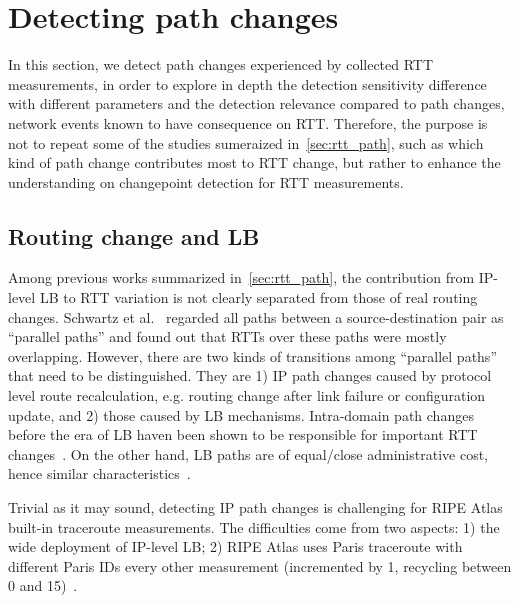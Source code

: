 
\section{Detecting path changes}
\label{sec:path}

In this section, we detect path changes experienced by collected RTT measurements, in order to explore in depth the detection sensitivity difference with different parameters and the detection relevance compared to path changes, network events known to have consequence on RTT.
Therefore, the purpose is not to repeat some of the studies sumeraized in~\ref{sec:rtt_path}, such as which kind of path change contributes most to RTT change, but rather to enhance the understanding on changepoint detection for RTT measurements.


\subsection{Routing change and \acf{LB}}

Among previous works summarized in~\ref{sec:rtt_path}, the contribution from IP-level LB to RTT variation is not clearly separated from those of real routing changes.
Schwartz et al.~\cite{Schwartz2010} regarded all paths between a source-destination pair as ``parallel paths'' and found out that RTTs over these paths were mostly overlapping.
However, there are two kinds of transitions among ``parallel paths'' that need to be distinguished.
They are 1) IP path changes caused by protocol level route recalculation, e.g. routing change after link failure or configuration update, 
and 2) those caused by LB mechanisms. 
Intra-domain path changes before the era of LB haven been shown to be responsible for important RTT changes~\cite{Pucha2007}. 
On the other hand, LB paths are of equal/close administrative cost, hence similar characteristics~\cite{Augustin2011}.
 
Trivial as it may sound, detecting IP path changes is challenging for RIPE Atlas built-in traceroute measurements.
The difficulties come from two aspects: 1) the wide deployment of IP-level LB; 2) RIPE Atlas uses Paris traceroute with different Paris IDs every other measurement (incremented by 1, recycling between 0 and 15)~\cite{Augustin2006, Pelsser2013}.

